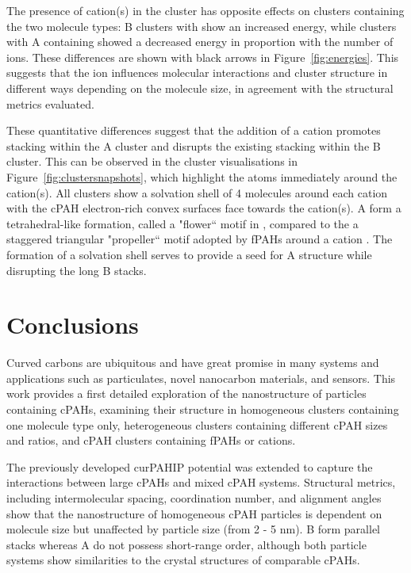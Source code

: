 The presence of cation(s) in the cluster has opposite effects on clusters containing the two molecule types: B clusters with  show an increased energy, while clusters with A containing  showed a decreased energy in proportion with the number of ions.  These differences are shown with black arrows in Figure~\ref{fig:energies}. This suggests that the ion influences molecular interactions and cluster structure in different ways depending on the molecule size, in agreement with the structural metrics evaluated.

These quantitative differences suggest that the addition of a cation promotes stacking within the A cluster and disrupts the existing stacking within the B cluster. This can be observed in the cluster visualisations in Figure~\ref{fig:clustersnapshots}, which highlight the atoms immediately around the cation(s). All clusters show a solvation shell of 4 molecules around each cation with the cPAH electron-rich convex surfaces face towards the cation(s). A form a tetrahedral-like formation, called a "flower`` motif in \citet{bowal2019ion}, compared to the a staggered triangular "propeller`` motif adopted by fPAHs around a cation \cite{bartolomei2019aggregation}. The formation of a solvation shell serves to provide a seed for A structure while disrupting the long B stacks.

\section{Conclusions}
Curved carbons are ubiquitous and have great promise in many systems and applications such as particulates, novel nanocarbon materials, and sensors. This work provides a first detailed exploration of the nanostructure of particles containing cPAHs, examining their structure in homogeneous clusters containing one molecule type only, heterogeneous clusters containing different cPAH sizes and ratios, and cPAH clusters containing fPAHs or cations.

The previously developed curPAHIP potential was extended to capture the interactions between large cPAHs and mixed cPAH systems. Structural metrics, including intermolecular spacing, coordination number, and alignment angles show that the nanostructure of homogeneous cPAH particles is dependent on molecule size but unaffected by particle size (from 2 - 5 nm). B form parallel stacks whereas A do not possess short-range order, although both particle systems show similarities to the crystal structures of comparable cPAHs.

